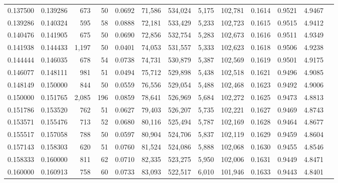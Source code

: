 \begin{tabular}{rrrrrrrrrrrrr}
0.137500 & 0.139286 &    673 &    50 &                                     0.0692 &  71,586 & 534,024 &   5,175 & 102,781 & 0.1614 & 0.9521 & 4.9467 \\
0.139286 & 0.140324 &    595 &    58 &                                     0.0888 &  72,181 & 533,429 &   5,233 & 102,723 & 0.1615 & 0.9515 & 4.9412 \\
0.140476 & 0.141905 &    675 &    50 &                                     0.0690 &  72,856 & 532,754 &   5,283 & 102,673 & 0.1616 & 0.9511 & 4.9349 \\
0.141938 & 0.144433 &  1,197 &    50 &                                     0.0401 &  74,053 & 531,557 &   5,333 & 102,623 & 0.1618 & 0.9506 & 4.9238 \\
0.144444 & 0.146035 &    678 &    54 &                                     0.0738 &  74,731 & 530,879 &   5,387 & 102,569 & 0.1619 & 0.9501 & 4.9175 \\
0.146077 & 0.148111 &    981 &    51 &                                     0.0494 &  75,712 & 529,898 &   5,438 & 102,518 & 0.1621 & 0.9496 & 4.9085 \\
0.148149 & 0.150000 &    844 &    50 &                                     0.0559 &  76,556 & 529,054 &   5,488 & 102,468 & 0.1623 & 0.9492 & 4.9006 \\
0.150000 & 0.151765 &  2,085 &   196 &                                     0.0859 &  78,641 & 526,969 &   5,684 & 102,272 & 0.1625 & 0.9473 & 4.8813 \\
0.151786 & 0.153520 &    762 &    51 &                                     0.0627 &  79,403 & 526,207 &   5,735 & 102,221 & 0.1627 & 0.9469 & 4.8743 \\
0.153571 & 0.155476 &    713 &    52 &                                     0.0680 &  80,116 & 525,494 &   5,787 & 102,169 & 0.1628 & 0.9464 & 4.8677 \\
0.155517 & 0.157058 &    788 &    50 &                                     0.0597 &  80,904 & 524,706 &   5,837 & 102,119 & 0.1629 & 0.9459 & 4.8604 \\
0.157143 & 0.158303 &    620 &    51 &                                     0.0760 &  81,524 & 524,086 &   5,888 & 102,068 & 0.1630 & 0.9455 & 4.8546 \\
0.158333 & 0.160000 &    811 &    62 &                                     0.0710 &  82,335 & 523,275 &   5,950 & 102,006 & 0.1631 & 0.9449 & 4.8471 \\
0.160000 & 0.160913 &    758 &    60 &                                     0.0733 &  83,093 & 522,517 &   6,010 & 101,946 & 0.1633 & 0.9443 & 4.8401 \\

\end{tabular}
